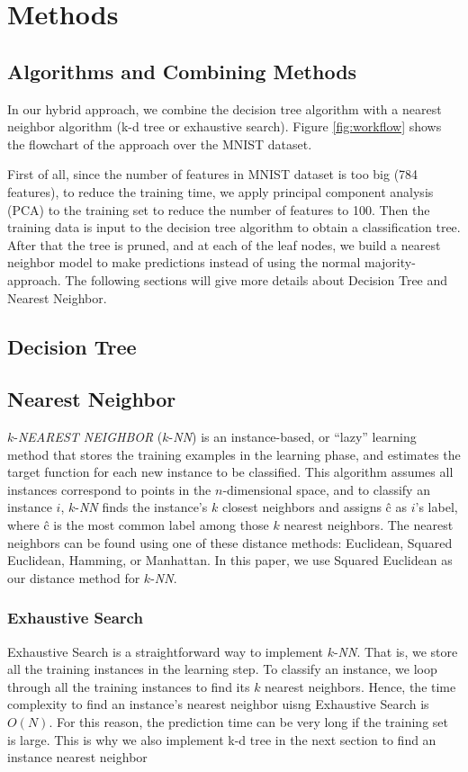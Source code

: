 \section{Methods}
	\subsection{Algorithms and Combining Methods}
		In our hybrid approach, we combine the decision tree algorithm with a nearest neighbor algorithm (k-d tree or exhaustive search). Figure \ref{fig:workflow} shows the flowchart of the approach over the MNIST dataset. 
		
		First of all, since the number of features in MNIST dataset is too big (784 features), to reduce the training time, we apply principal component analysis (PCA) to the training set to reduce the number of features to 100. Then the training data is input to the decision tree algorithm to obtain a classification tree. After that the tree is pruned, and at each of the leaf nodes, we build a nearest neighbor model to make predictions instead of using the normal majority-approach. The following sections will give more details about Decision Tree and Nearest Neighbor.
		
	\subsection{Decision Tree}
    
	\subsection{Nearest Neighbor}
		$k$-\textit{NEAREST NEIGHBOR} ($k$-\textit{NN}) is an instance-based, or ``lazy'' learning method that stores the training examples in the learning phase, and estimates the target function for each new instance to be classified. This algorithm assumes all instances correspond to points in the $n$-dimensional space, and to classify an instance $i$, $k$-\textit{NN} finds the instance's $k$ closest neighbors and assigns \^{c} as $i$'s label, where \^{c} is the most common label among those $k$ nearest neighbors. The nearest neighbors can be found using one of these distance methods: Euclidean, Squared Euclidean, Hamming, or Manhattan. In this paper, we use Squared Euclidean as our distance method for $k$-\textit{NN}.
		\subsubsection{Exhaustive Search}
		Exhaustive Search is a straightforward way to implement $k$-\textit{NN}. That is, we store all the training instances in the learning step. To classify an instance, we loop through all the training instances to find its $k$ nearest neighbors. Hence, the time complexity to find an instance's nearest neighbor uisng Exhaustive Search is $O(N)$. For this reason, the prediction time can be very long if the training set is large. This is why we also implement k-d tree in the next section to find an instance nearest neighbor
		
